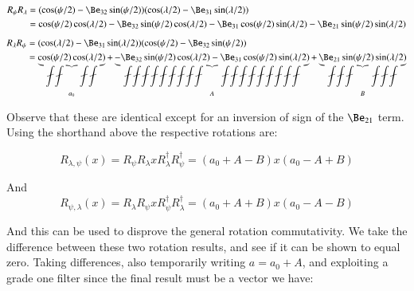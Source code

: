 \begin{align*}
R_{\psi} R_{\lambda} 
&= ( \cos(\psi/2) - \Be_{32}\sin(\psi/2) )(\cos(\lambda/2) - \Be_{31}\sin(\lambda/2)) \\
&= \cos(\psi/2)\cos(\lambda/2) - \Be_{32}\sin(\psi/2)\cos(\lambda/2) - \Be_{31} \cos(\psi/2) \sin(\lambda/2) - \Be_{21} \sin(\psi/2) \sin(\lambda/2) \\
\end{align*}
\begin{align*}
R_{\lambda} R_{\psi}
&= (\cos(\lambda/2) - \Be_{31}\sin(\lambda/2)) ( \cos(\psi/2) - \Be_{32}\sin(\psi/2) ) \\
&= \underbrace{\cos(\psi/2)\cos(\lambda/2)}_{a_0} + \underbrace{-\Be_{32}\sin(\psi/2)\cos(\lambda/2) - \Be_{31} \cos(\psi/2) \sin(\lambda/2)}_{A} + \underbrace{\Be_{21} \sin(\psi/2) \sin(\lambda/2)}_{B}
\end{align*}

Observe that these are identical except for an inversion of sign of the $\Be_{21}$ term.  Using the shorthand above the respective rotations are:

\[
R_{\lambda,\psi}(x) = R_{\psi} R_{\lambda} x R_{\lambda}^\dagger R_{\psi}^\dagger = (a_0 + A - B) x (a_0 -A +B)
\]

And
\[
R_{\psi,\lambda}(x) = R_{\lambda} R_{\psi} x R_{\psi}^\dagger R_{\lambda}^\dagger = (a_0 + A + B) x (a_0 -A -B)
\]

And this can be used to disprove the general rotation commutativity.  We take the difference between these two rotation results, and see if it can be shown to equal zero.
Taking differences, also temporarily writing $a = a_0 + A$, and exploiting a grade one filter since the final result must be a vector we have:

